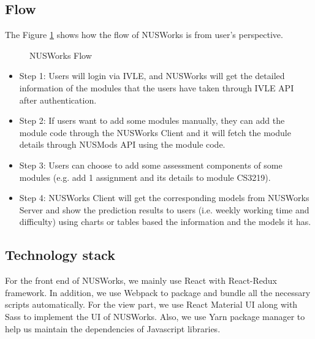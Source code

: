 \documentclass[fyp]{socreport}
\begin{document}
\subsection{Flow}
The Figure {\ref{flow}} shows how the flow of NUSWorks is from user’s perspective.

\begin{figure}
\caption{NUSWorks Flow}
\label{flow}
\end{figure}

\begin{itemize}
  \item Step 1: Users will login via IVLE, and NUSWorks will get the detailed information of the modules that the users have taken through IVLE API after authentication.
  \item Step 2: If users want to add some modules manually, they can add the module code through the NUSWorks Client and it will fetch the module details through NUSMods API using the module code.
	\item Step 3: Users can choose to add some assessment components of some modules (e.g. add 1 assignment and its details to module CS3219).
	\item Step 4: NUSWorks Client will get the corresponding models from NUSWorks Server and show the prediction results to users (i.e. weekly working time and difficulty) using charts or tables based the information and the models it has.
\end{itemize}

\subsection{Technology stack}
For the front end of NUSWorks, we mainly use React with React-Redux framework. In addition, we use Webpack to package and bundle all the necessary scripts automatically. For the view part, we use React Material UI along with Sass to implement the UI of NUSWorks. Also, we use Yarn package manager to help us maintain the dependencies of Javascript libraries.
\end{document}
